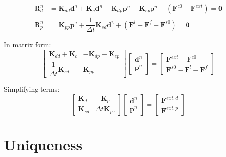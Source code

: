 \documentclass{article}
\begin{document}
\begin{equation}
\begin{aligned}
\mathbf{R}_d^n &= \mathbf{K}_{dd} \mathbf{d}^n 
+ \mathbf{K}_{c} \mathbf{d}^n  
- \mathbf{K}_{dp} \mathbf{p}^n 
- \mathbf{K}_{ep} \mathbf{p}^n 
+ \left(\mathbf{F}^{c0}
- \mathbf{F}^{ext} \right) = \mathbf{0}
\\
\mathbf{R}_p^n &= \mathbf{K}_{pp} \mathbf{p}^n
+ \dfrac{1}{\Delta t} \mathbf{K}_{sd} \mathbf{d}^n
+ \left(\mathbf{F}^{l} 
+ \mathbf{F}^{f} 
-\mathbf{F}^{s0}\right) = \mathbf{0}
\end{aligned}
\end{equation}

In matrix form:
\begin{equation}
	\begin{bmatrix}
		\mathbf{K}_{dd} + \mathbf{K}_{c} &
		 - \mathbf{K}_{dp} - \mathbf{K}_{ep} 
		\\
		\dfrac{1}{\Delta t} \mathbf{K}_{sd} &
		\mathbf{K}_{pp}
	\end{bmatrix}
	\begin{bmatrix}
	\mathbf{d}^n
	\\
	\mathbf{p}^n
	\end{bmatrix} 
	=
	\begin{bmatrix}
	\mathbf{F}^{ext} -\mathbf{F}^{c0}
	\\
	\mathbf{F}^{s0}
	-\mathbf{F}^{l} 
	-\mathbf{F}^{f} 
	\end{bmatrix}
\end{equation}

Simplifying terms:
\begin{equation}
\begin{bmatrix}
\mathbf{K}_{d} &
- \mathbf{K}_{p} 
\\
\mathbf{K}_{sd} &
\Delta t \mathbf{K}_{pp} 
\end{bmatrix}
\begin{bmatrix}
\mathbf{d}^n
\\
\mathbf{p}^n
\end{bmatrix} 
=
\begin{bmatrix}
\mathbf{F}^{ext,d}
\\
\mathbf{F}^{ext,p} 
\end{bmatrix}
	\label{eqn:coupled}
\end{equation}

\section{Uniqueness}
\end{document}
